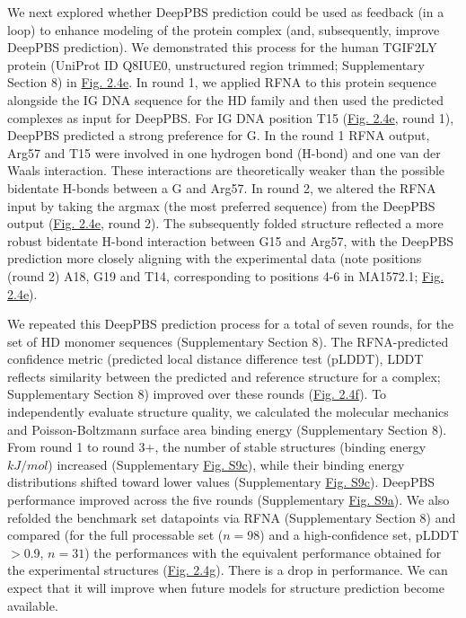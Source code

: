 \par
We next explored whether DeepPBS prediction could be used as feedback (in a loop) to enhance modeling of the protein complex (and, subsequently, improve DeepPBS prediction). We demonstrated this process for the human TGIF2LY protein (UniProt ID Q8IUE0, unstructured region trimmed; Supplementary Section 8) in \hyperref[fig:pdna3]{Fig. 2.4e}. In round 1, we applied RFNA to this protein sequence alongside the IG DNA sequence for the HD family and then used the predicted complexes as input for DeepPBS. For IG DNA position T15 (\hyperref[fig:pdna3]{Fig. 2.4e}, round 1), DeepPBS predicted a strong preference for G. In the round 1 RFNA output, Arg57 and T15 were involved in one hydrogen bond (H-bond) and one van der Waals interaction. These interactions are theoretically weaker than the possible bidentate H-bonds between a G and Arg57. In round 2, we altered the RFNA input by taking the argmax (the most preferred sequence) from the DeepPBS output (\hyperref[fig:pdna3]{Fig. 2.4e}, round 2). The subsequently folded structure reflected a more robust bidentate H-bond interaction between G15 and Arg57, with the DeepPBS prediction more closely aligning with the experimental data (note positions (round 2) A18, G19 and T14, corresponding to positions 4-6 in MA1572.1; \hyperref[fig:pdna3]{Fig. 2.4e}).
\par
We repeated this DeepPBS prediction process for a total of seven rounds, for the set of HD monomer sequences (Supplementary Section 8). The RFNA-predicted confidence metric (predicted local distance difference test (pLDDT), LDDT \citep{Mariani2013} reflects similarity between the predicted and reference structure for a complex; Supplementary Section 8) improved over these rounds (\hyperref[fig:pdna3]{Fig. 2.4f}). To independently evaluate structure quality, we calculated the molecular mechanics and Poisson-Boltzmann surface area \citep{Genheden2015} binding energy (Supplementary Section 8). From round 1 to round 3+, the number of stable structures (binding energy $kJ/mol$) increased (Supplementary \hyperref[fig:pdnaS9]{Fig. S9c}), while their binding energy distributions shifted toward lower values (Supplementary \hyperref[fig:pdnaS9]{Fig. S9c}). DeepPBS performance improved across the five rounds (Supplementary \hyperref[fig:pdnaS9]{Fig. S9a}). We also refolded the benchmark set datapoints via RFNA (Supplementary Section 8) and compared (for the full processable set ($n=98$) and a high-confidence set, pLDDT $>$0.9, $n=31$) the performances with the equivalent performance obtained for the experimental structures (\hyperref[fig:pdna3]{Fig. 2.4g}). There is a drop in performance. We can expect that it will improve when future models for structure prediction become available.
